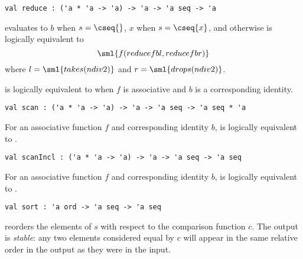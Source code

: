 \begin{flex}
\label{grp:grm:seq-interface::reduce}

\begin{gram}
\label{grm:seq-interface::reduce}
\begin{gram}[reduce]
\label{gr:reduce}
\begin{verbatim}
val reduce : ('a * 'a -> 'a) -> 'a -> 'a seq -> 'a
\end{verbatim}
 evaluates to $b$ when $s = \cseq{}$,
$x$ when $s = \cseq{x}$, and otherwise is logically equivalent to
\[
  \sml{f (reduce f b l, reduce f b r)}
\]
where $l = \sml{take s (n div 2)}$ and $r = \sml{drop s (n div 2)}$.
\end{gram}
\begin{note}
 is logically equivalent to  when
$f$ is associative and $b$ is a corresponding identity.
\end{note}

\end{gram}
\end{flex}

\begin{cluster}
\label{grp:gr:scan}

\begin{gram}[scan]
\label{gr:scan}
\begin{verbatim}
val scan : ('a * 'a -> 'a) -> 'a -> 'a seq -> 'a seq * 'a
\end{verbatim}
For an associative function $f$ and corresponding identity $b$, 
is logically equivalent to .

\end{gram}
\end{cluster}

\begin{cluster}
\label{grp:gr:scanIncl}

\begin{gram}[scanIncl]
\label{gr:scanIncl}
\begin{verbatim}
val scanIncl : ('a * 'a -> 'a) -> 'a -> 'a seq -> 'a seq
\end{verbatim}
For an associative function $f$ and corresponding identity $b$, 
is logically equivalent to .

\end{gram}
\end{cluster}

\begin{cluster}
\label{grp:gr:sort}

\begin{gram}[sort]
\label{gr:sort}
\begin{verbatim}
val sort : 'a ord -> 'a seq -> 'a seq
\end{verbatim}
 reorders the elements of $s$ with respect to the comparison
function $c$. The output is \emph{stable}: any two elements considered equal
by $c$ will appear in the same relative order in the output as they were
in the input.

\end{gram}
\end{cluster}

